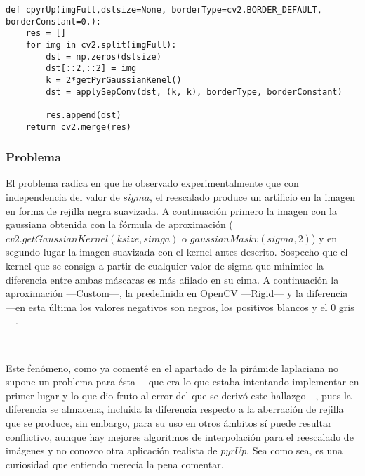 \documentclass{article}
\newcommand{\img}[2]{
\noindent\makebox[\textwidth][c]{\texttt{[image: \#1]}}%
}
\begin{document}
\begin{lstlisting}
def cpyrUp(imgFull,dstsize=None, borderType=cv2.BORDER_DEFAULT, borderConstant=0.):
    res = []
    for img in cv2.split(imgFull):
        dst = np.zeros(dstsize)
        dst[::2,::2] = img
        k = 2*getPyrGaussianKenel()
        dst = applySepConv(dst, (k, k), borderType, borderConstant)

        res.append(dst)
    return cv2.merge(res)
\end{lstlisting}

\subsubsection{Problema}

El problema radica en que he observado experimentalmente que con independencia del valor de $sigma$, el reescalado produce un artificio en la imagen en forma de rejilla negra suavizada. A continuación primero la imagen con la gaussiana obtenida con la fórmula de aproximación ($cv2.getGaussianKernel(ksize,simga)$ o $gaussianMaskv(sigma,2)$) y en segundo lugar la imagen suavizada con el kernel antes descrito. Sospecho que el kernel que se consiga a partir de cualquier valor de sigma que minimice la diferencia entre ambas máscaras es más afilado en su cima. A continuación la aproximación ---Custom---, la predefinida en OpenCV ---Rigid--- y la diferencia ---en esta última los valores negativos son negros, los positivos blancos y el 0 gris---.

\img{eximg/extra_soft}{0.6}

\img{eximg/extra_g1}{0.6}
\\

\img{eximg/extra_g2}{0.6}

Este fenómeno, como ya comenté en el apartado de la pirámide laplaciana no supone un problema para ésta ---que era lo que estaba intentando implementar en primer lugar y lo que dio fruto al error del que se derivó este hallazgo---, pues la diferencia se almacena, incluida la diferencia respecto a la aberración de rejilla que se produce, sin embargo, para su uso en otros ámbitos sí puede resultar conflictivo, aunque hay mejores algoritmos de interpolación para el reescalado de imágenes y no conozco otra aplicación realista de $pyrUp$. Sea como sea, es una curiosidad que entiendo merecía la pena comentar.
\end{document}
